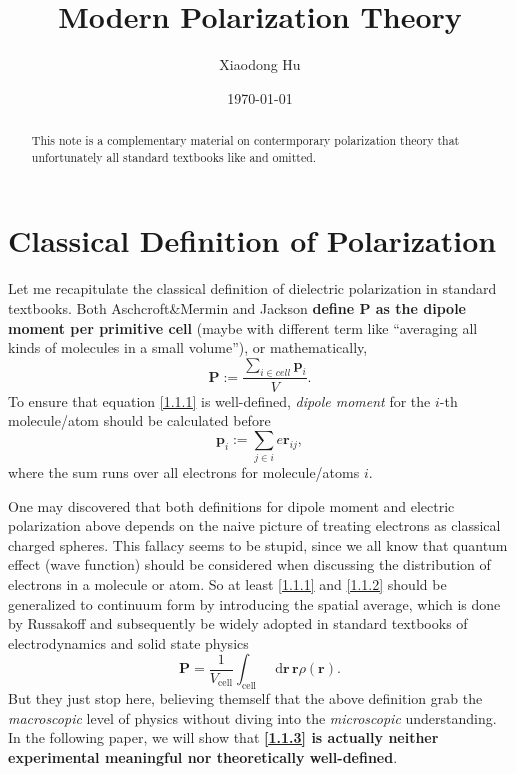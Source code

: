 \documentclass[10pt,nofootinbib]{revtex4}
\newcommand*\dd{\mathop{}\!\mathrm{d}}
\newcounter{Def}[section]
\begin{document}
\title{Modern Polarization Theory}%

\author{Xiaodong Hu}

\date{\today}

\begin{abstract}
	This note is a complementary material on contermporary polarization theory that unfortunately all standard textbooks like \cite{jackson1999classical} and \cite{Ashcroft} omitted.
\end{abstract}
\maketitle
\tableofcontents

\section{Classical Definition of Polarization }

	Let me recapitulate the classical definition of dielectric polarization in standard textbooks. Both Aschcroft\&Mermin and Jackson \textbf{define $\bm{P}$ as the dipole moment per primitive cell} (maybe with different term like ``averaging all kinds of molecules in a small volume''), or mathematically,
	\begin{equation}\label{1.1.1}
		\bm{P}:=\dfrac{\sum_{i\in cell}\bm{p}_i}{V}.
	\end{equation}
	To ensure that equation \eqref{1.1.1} is well-defined, \emph{dipole moment} for the $i$-th molecule/atom should be calculated before
	\begin{equation}\label{1.1.2}
		\bm{p}_i:=\sum_{j\in i}e\bm{r}_{ij},
	\end{equation}
	where the sum runs over all electrons for molecule/atoms $i$.\par
	One may discovered that both definitions for dipole moment and electric polarization above depends on the naive picture of treating electrons as classical charged spheres. This fallacy seems to be stupid, since we all know that quantum effect (wave function) should be considered when discussing the distribution of electrons in a molecule or atom. So at least \eqref{1.1.1} and \eqref{1.1.2} should be generalized to continuum form by introducing the spatial average, which is done by Russakoff \cite{russakoff1970derivation} and subsequently be widely adopted in standard textbooks of electrodynamics \cite{jackson1999classical} and solid state physics \cite{Ashcroft}
	\begin{equation}\label{1.1.3}
		\bm{P}=\dfrac{1}{V_\text{cell}}\int_{\text{cell}}\dd\bm{r}\,\bm{r}\rho(\bm{r}).
	\end{equation}
	But they just stop here, believing themself that the above definition grab the \emph{macroscopic} level of physics without diving into the \emph{microscopic} understanding. In the following paper, we will show that \textbf{\eqref{1.1.3} is actually neither experimental meaningful nor theoretically well-defined}.
\end{document}
